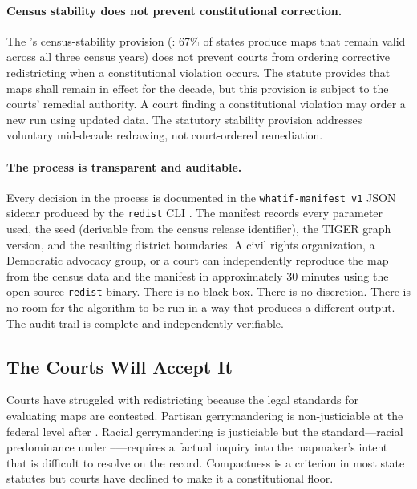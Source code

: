 \paragraph{Census stability does not prevent constitutional correction.}
The \dia{}'s census-stability provision (\citet{b15paper}: 67\% of states
produce maps that remain valid across all three census years) does not prevent
courts from ordering corrective redistricting when a constitutional violation
occurs.
The statute provides that maps shall remain in effect for the decade, but
this provision is subject to the courts' remedial authority.
A court finding a constitutional violation may order a new \ar{} run using
updated data.
The statutory stability provision addresses voluntary mid-decade redrawing,
not court-ordered remediation.

\paragraph{The process is transparent and auditable.}
Every decision in the \ar{} process is documented in the \texttt{whatif-manifest
v1} JSON sidecar produced by the \texttt{redist} CLI \citep{b0paper}.
The manifest records every parameter used, the seed (derivable from the
census release identifier), the TIGER graph version, and the resulting
district boundaries.
A civil rights organization, a Democratic advocacy group, or a court
can independently reproduce the map from the census data and the
manifest in approximately 30 minutes using the open-source \texttt{redist}
binary.
There is no black box.
There is no discretion.
There is no room for the algorithm to be run in a way that produces a
different output.
The audit trail is complete and independently verifiable.

\subsection{The Courts Will Accept It}

Courts have struggled with redistricting because the legal standards for
evaluating maps are contested.
Partisan gerrymandering is non-justiciable at the federal level after \rucho{}.
Racial gerrymandering is justiciable but the standard---racial predominance
under \shaw{}--\miller{}---requires a factual inquiry into the mapmaker's
intent that is difficult to resolve on the record.
Compactness is a criterion in most state statutes but courts have declined
to make it a constitutional floor.

